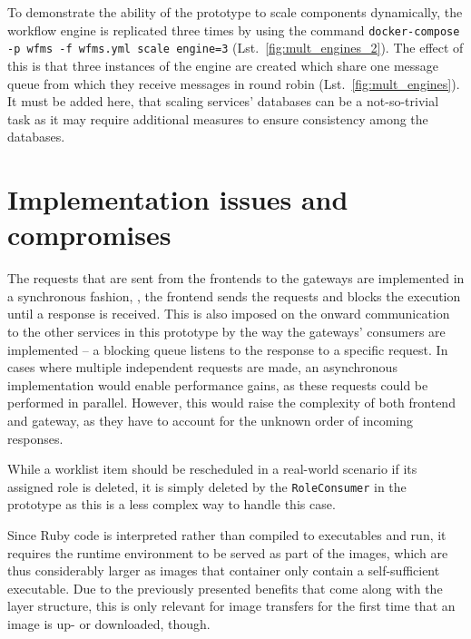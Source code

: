   To demonstrate the ability of the prototype to scale components dynamically, the workflow engine is replicated three times by using the command \texttt{docker-compose -p wfms -f wfms.yml scale engine=3} (Lst.~\ref{fig:mult_engines_2}). The effect of this is that three instances of the engine are created which share one message queue from which they receive messages in round robin (Lst.~\ref{fig:mult_engines}). It must be added here, that scaling services' databases can be a not-so-trivial task as it may require additional measures to ensure consistency among the databases.

\section{Implementation issues and compromises} %
  \label{sec:implementation_issues}
  The requests that are sent from the frontends to the gateways are implemented in a synchronous fashion, \ie, the frontend sends the requests and blocks the execution until a response is received. This is also imposed on the onward communication to the other services in this prototype by the way the gateways' consumers are implemented -- a blocking queue listens to the response to a specific request. In cases where multiple independent requests are made, an asynchronous implementation would enable performance gains, as these requests could be performed in parallel. However, this would raise the complexity of both frontend and gateway, as they have to account for the unknown order of incoming responses.

  While a worklist item should be rescheduled in a real-world scenario if its assigned role is deleted, it is simply deleted by the \texttt{RoleConsumer} in the prototype as this is a less complex way to handle this case.

  Since Ruby code is interpreted rather than compiled to executables and run, it requires the runtime environment to be served as part of the images, which are thus considerably larger as images that container only contain a self-sufficient executable. Due to the previously presented benefits that come along with the layer structure, this is only relevant for image transfers for the first time that an image is up- or downloaded, though.

